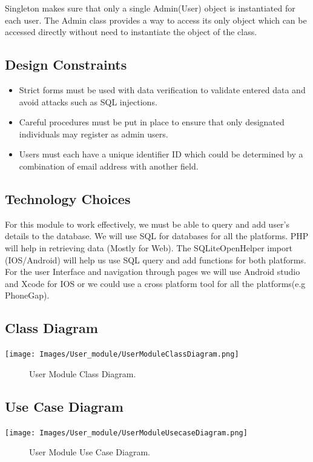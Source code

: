 \documentclass[a4paper, 12pt, one column]{article}
\begin{document}
Singleton makes sure that only a single Admin(User) object is instantiated for each user. The Admin class provides a way to access its only object which can be accessed directly without need to instantiate the object of the class.

\subsection{Design Constraints}
\begin{itemize}
	\item Strict forms must be used with data verification to validate entered data and avoid attacks such as SQL injections.
    \item Careful procedures must be put in place to ensure that only designated individuals may register as admin users.
    \item Users must each have a unique identifier ID which could be determined by a combination of email address with another field.
\end{itemize}
\subsection{Technology Choices}
For this module to work effectively, we must be able to query and add user's details to the database. We will use SQL for databases for all the platforms. PHP will help in retrieving data (Mostly for Web). The SQLiteOpenHelper import (IOS/Android) will help us use SQL query and add functions for both platforms.
For the user Interface and navigation through pages we will use Android studio and Xcode for IOS or we could use a cross platform tool for all the platforms(e.g PhoneGap). 

\begin{center}
\subsection{Class Diagram}
        \texttt{[image: Images/User\_module/UserModuleClassDiagram.png]}
        \begin{figure}[h]
            \caption{User Module Class Diagram.}
        \end{figure}
        
\subsection{Use Case Diagram}
        \texttt{[image: Images/User\_module/UserModuleUsecaseDiagram.png]}
        \begin{figure}[h]
            \caption{User Module Use Case Diagram.}
        \end{figure}
        
\end{center}
\end{document}
